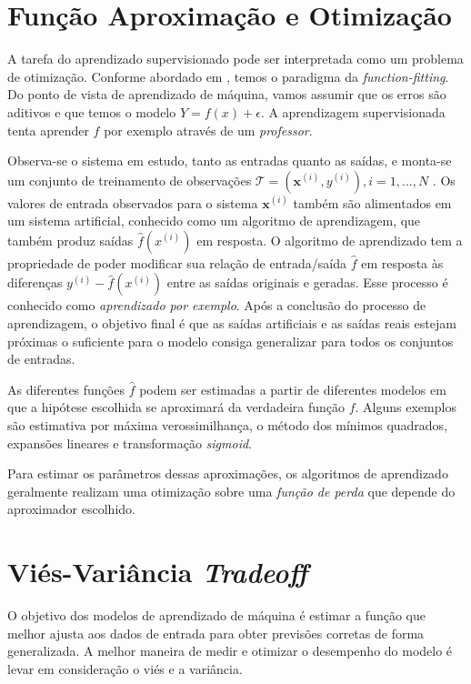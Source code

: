 \section{Função Aproximação e Otimização}

A tarefa do aprendizado supervisionado pode ser interpretada como um problema de otimização. Conforme abordado em \cite{hastie}, 
temos o paradigma da \textit{function-fitting}. Do ponto de vista de aprendizado de máquina, vamos assumir que os erros são aditivos e que temos o modelo $Y = f(x) + \epsilon$. A aprendizagem supervisionada tenta aprender $f$ por
exemplo através de um \textit{professor}. 

Observa-se o sistema em estudo, tanto
as entradas quanto as saídas, e monta-se um conjunto de treinamento de observações $\mathcal{T} =
(\mathbf{x}^{(i)},{y}^{(i)}), i = 1, . . . , N$ . Os valores de entrada observados para o sistema $\mathbf{x}^{(i)}$ também são alimentados em um sistema artificial, conhecido como um algoritmo de aprendizagem, que também produz saídas $\hat{f}(x^{(i)})$ em resposta. O algoritmo de aprendizado tem a propriedade de poder modificar sua relação de entrada/saída $\hat{f}$ em resposta às diferenças ${y}^{(i)}-\hat{f}(x^{(i)})$ entre as saídas originais e geradas. Esse processo é conhecido como \textit{aprendizado por exemplo}. Após a conclusão do processo de aprendizagem, o objetivo final é que as saídas artificiais e as saídas reais estejam próximas o suficiente para o modelo consiga generalizar para todos os conjuntos de entradas.

As diferentes funções $\hat{f}$ podem ser estimadas a partir de diferentes modelos em que a hipótese escolhida se aproximará da verdadeira função $f$. Alguns exemplos são estimativa por máxima verossimilhança, o método dos mínimos quadrados, expansões lineares e transformação \textit{sigmoid}.

Para estimar os parâmetros dessas aproximações, os algoritmos de aprendizado geralmente realizam uma otimização sobre uma \textit{função de perda} \cite{kuhn} que depende do aproximador escolhido.

\section{Viés-Variância \textit{Tradeoff}}
O objetivo dos modelos de aprendizado de máquina é estimar a função que melhor ajusta aos dados de entrada para obter previsões corretas de forma generalizada. A melhor maneira de medir e otimizar o desempenho do modelo é levar em consideração o viés e a variância.

